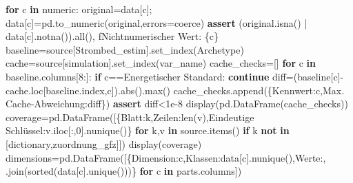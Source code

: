 \documentclass[
  ngerman,
  a4paper,
  DIV=11]{scrreprt}
\newenvironment{Shaded}{\begin{snugshade}}{\end{snugshade}}
\newcommand{\BuiltInTok}[1]{\textcolor[rgb]{0.00,0.23,0.31}{#1}}
\newcommand{\ControlFlowTok}[1]{\textcolor[rgb]{0.00,0.23,0.31}{\textbf{#1}}}
\newcommand{\DecValTok}[1]{\textcolor[rgb]{0.68,0.00,0.00}{#1}}
\newcommand{\FloatTok}[1]{\textcolor[rgb]{0.68,0.00,0.00}{#1}}
\newcommand{\KeywordTok}[1]{\textcolor[rgb]{0.00,0.23,0.31}{\textbf{#1}}}
\newcommand{\NormalTok}[1]{\textcolor[rgb]{0.00,0.23,0.31}{#1}}
\newcommand{\OperatorTok}[1]{\textcolor[rgb]{0.37,0.37,0.37}{#1}}
\newcommand{\SpecialCharTok}[1]{\textcolor[rgb]{0.37,0.37,0.37}{#1}}
\newcommand{\SpecialStringTok}[1]{\textcolor[rgb]{0.13,0.47,0.30}{#1}}
\newcommand{\StringTok}[1]{\textcolor[rgb]{0.13,0.47,0.30}{#1}}
\begin{document}
\begin{Shaded}
\begin{Highlighting}[]
\ControlFlowTok{for}\NormalTok{ c }\KeywordTok{in}\NormalTok{ numeric:}
\NormalTok{    original}\OperatorTok{=}\NormalTok{data[c]}\OperatorTok{;}\NormalTok{ data[c]}\OperatorTok{=}\NormalTok{pd.to\_numeric(original,errors}\OperatorTok{=}\StringTok{\textquotesingle{}coerce\textquotesingle{}}\NormalTok{)}
    \ControlFlowTok{assert}\NormalTok{ (original.isna() }\OperatorTok{|}\NormalTok{ data[c].notna()).}\BuiltInTok{all}\NormalTok{(), }\SpecialStringTok{f\textquotesingle{}Nichtnumerischer Wert: }\SpecialCharTok{\{}\NormalTok{c}\SpecialCharTok{\}}\SpecialStringTok{\textquotesingle{}}
\NormalTok{baseline}\OperatorTok{=}\NormalTok{source[}\StringTok{\textquotesingle{}Strombed\_estim\textquotesingle{}}\NormalTok{].set\_index(}\StringTok{\textquotesingle{}Archetype\textquotesingle{}}\NormalTok{)}
\NormalTok{cache}\OperatorTok{=}\NormalTok{source[}\StringTok{\textquotesingle{}simulation\textquotesingle{}}\NormalTok{].set\_index(}\StringTok{\textquotesingle{}var\_name\textquotesingle{}}\NormalTok{)}
\NormalTok{cache\_checks}\OperatorTok{=}\NormalTok{[]}
\ControlFlowTok{for}\NormalTok{ c }\KeywordTok{in}\NormalTok{ baseline.columns[}\DecValTok{8}\NormalTok{:]:}
    \ControlFlowTok{if}\NormalTok{ c}\OperatorTok{==}\StringTok{\textquotesingle{}Energetischer Standard\textquotesingle{}}\NormalTok{: }\ControlFlowTok{continue}
\NormalTok{    diff}\OperatorTok{=}\NormalTok{(baseline[c]}\OperatorTok{{-}}\NormalTok{cache.loc[baseline.index,c]).}\BuiltInTok{abs}\NormalTok{().}\BuiltInTok{max}\NormalTok{()}
\NormalTok{    cache\_checks.append(\{}\StringTok{\textquotesingle{}Kennwert\textquotesingle{}}\NormalTok{:c,}\StringTok{\textquotesingle{}Max. Cache{-}Abweichung\textquotesingle{}}\NormalTok{:diff\})}
    \ControlFlowTok{assert}\NormalTok{ diff}\OperatorTok{\textless{}}\FloatTok{1e{-}8}
\NormalTok{display(pd.DataFrame(cache\_checks))}
\NormalTok{coverage}\OperatorTok{=}\NormalTok{pd.DataFrame([\{}\StringTok{\textquotesingle{}Blatt\textquotesingle{}}\NormalTok{:k,}\StringTok{\textquotesingle{}Zeilen\textquotesingle{}}\NormalTok{:}\BuiltInTok{len}\NormalTok{(v),}\StringTok{\textquotesingle{}Eindeutige Schlüssel\textquotesingle{}}\NormalTok{:v.iloc[:,}\DecValTok{0}\NormalTok{].nunique()\} }\ControlFlowTok{for}\NormalTok{ k,v }\KeywordTok{in}\NormalTok{ source.items() }\ControlFlowTok{if}\NormalTok{ k }\KeywordTok{not} \KeywordTok{in}\NormalTok{ [}\StringTok{\textquotesingle{}dictionary\textquotesingle{}}\NormalTok{,}\StringTok{\textquotesingle{}zuordnung\_gfz\textquotesingle{}}\NormalTok{]])}
\NormalTok{display(coverage)}
\NormalTok{dimensions}\OperatorTok{=}\NormalTok{pd.DataFrame([\{}\StringTok{\textquotesingle{}Dimension\textquotesingle{}}\NormalTok{:c,}\StringTok{\textquotesingle{}Klassen\textquotesingle{}}\NormalTok{:data[c].nunique(),}\StringTok{\textquotesingle{}Werte\textquotesingle{}}\NormalTok{:}\StringTok{\textquotesingle{}, \textquotesingle{}}\NormalTok{.join(}\BuiltInTok{sorted}\NormalTok{(data[c].unique()))\} }\ControlFlowTok{for}\NormalTok{ c }\KeywordTok{in}\NormalTok{ parts.columns])}

\end{Highlighting}
\end{Shaded}
\end{document}
